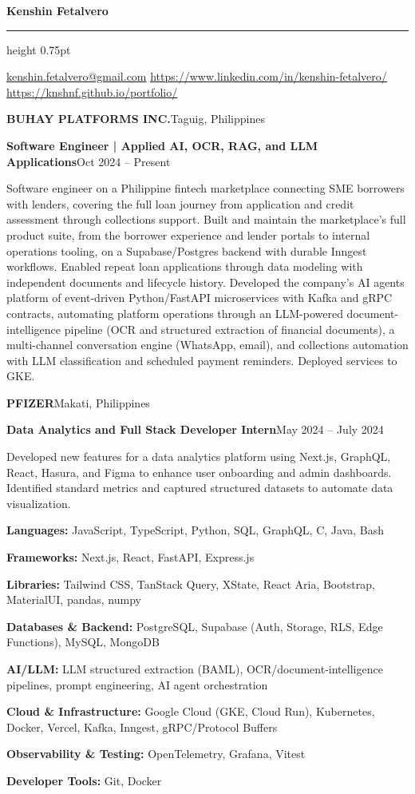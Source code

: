 \documentclass[10pt,letterpaper]{article}
\newcommand{\gap}{\par\vspace{\baselineskip}}
\newcommand{\heading}[1]{\gap{\centering\textbf{#1}\par}\vspace{\baselineskip}}
\newcommand{\role}[4]{\textbf{#1}\hfill #2\par\textbf{#3}\hfill #4\par}
\newcommand{\weblink}[1]{\href{#1}{\textcolor{linkblue}{\underline{#1}}}}
\begin{document}
\fontsize{10}{11.5}\selectfont

{\centering\textbf{Kenshin Fetalvero}\par}
\vspace{2pt}
\hrule height 0.75pt
\vspace{2pt}
{\centering\fontsize{9}{11}\selectfont
\href{mailto:kenshin.fetalvero@gmail.com}{kenshin.fetalvero@gmail.com} \textbullet{}
\weblink{https://www.linkedin.com/in/kenshin-fetalvero/} \textbullet{}
\weblink{https://knshnf.github.io/portfolio/}\par}

\heading{Relevant Experience}

\role{BUHAY PLATFORMS INC.}{Taguig, Philippines}
  {Software Engineer | Applied AI, OCR, RAG, and LLM Applications}{Oct 2024 -- Present}
Software engineer on a Philippine fintech marketplace connecting SME borrowers with lenders, covering the full loan
journey from application and credit assessment through collections support. Built and maintain the marketplace's full
product suite, from the borrower experience and lender portals to internal operations tooling, on a Supabase/Postgres
backend with durable Inngest workflows. Enabled repeat loan applications through data modeling with independent
documents and lifecycle history. Developed the company's AI agents platform of event-driven Python/FastAPI
microservices with Kafka and gRPC contracts, automating platform operations through an LLM-powered
document-intelligence pipeline (OCR and structured extraction of financial documents), a multi-channel conversation
engine (WhatsApp, email), and collections automation with LLM classification and scheduled payment reminders.
Deployed services to GKE.
\gap

\role{PFIZER}{Makati, Philippines}
  {Data Analytics and Full Stack Developer Intern}{May 2024 -- July 2024}
Developed new features for a data analytics platform using Next.js, GraphQL, React, Hasura, and Figma to enhance user
onboarding and admin dashboards. Identified standard metrics and captured structured datasets to automate data
visualization.

\heading{Technical Skills}

{\raggedright
\textbf{Languages:} JavaScript, TypeScript, Python, SQL, GraphQL, C, Java, Bash\par
\textbf{Frameworks:} Next.js, React, FastAPI, Express.js\par
\textbf{Libraries:} Tailwind CSS, TanStack Query, XState, React Aria, Bootstrap, MaterialUI, pandas, numpy\par
\textbf{Databases \& Backend:} PostgreSQL, Supabase (Auth, Storage, RLS, Edge Functions), MySQL, MongoDB\par
\textbf{AI/LLM:} LLM structured extraction (BAML), OCR/document-intelligence pipelines, prompt engineering, AI agent
orchestration\par
\textbf{Cloud \& Infrastructure:} Google Cloud (GKE, Cloud Run), Kubernetes, Docker, Vercel, Kafka, Inngest,
gRPC/Protocol Buffers\par
\textbf{Observability \& Testing:} OpenTelemetry, Grafana, Vitest\par
\textbf{Developer Tools:} Git, Docker\par}
\end{document}
